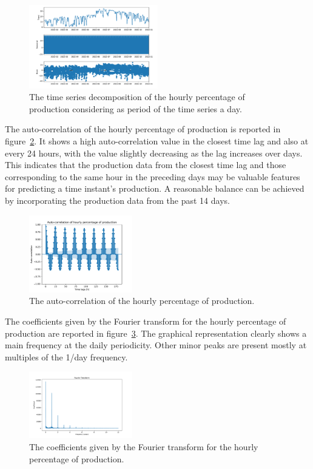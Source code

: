 \begin{figure}[H]
\centering
\includegraphics[width=0.5\textwidth]{images/production/hourly_decomposition}
\caption{The time series decomposition of the hourly percentage of production considering as period of the time series a day.}
\label{fig:productiondecomposition}
\end{figure}

The auto-correlation of the hourly percentage of production is reported in figure~\ref{fig:productioncorrelation}.
It shows a high auto-correlation value in the closest time lag and also at every 24 hours, with the value slightly decreasing as the lag increases over days.
This indicates that the production data from the closest time lag and those corresponding to the same hour in the preceding days may be valuable features for predicting a time instant's production.
A reasonable balance can be achieved by incorporating the production data from the past 14 days.

\begin{figure}[H]
\centering
\includegraphics[width=0.4\textwidth]{images/production/hourly_correlation_week_range}
\caption{The auto-correlation of the hourly percentage of production.}
\label{fig:productioncorrelation}
\end{figure}

The coefficients given by the Fourier transform for the hourly percentage of production are reported in figure~\ref{fig:productionft}.
The graphical representation clearly shows a main frequency at the daily periodicity.
Other minor peaks are present mostly at multiples of the 1/day frequency.

\begin{figure}[H]
\centering
\includegraphics[width=0.4\textwidth]{images/production/ft_hour_day}
\caption{The coefficients given by the Fourier transform for the hourly percentage of production.}
\label{fig:productionft}
\end{figure}

